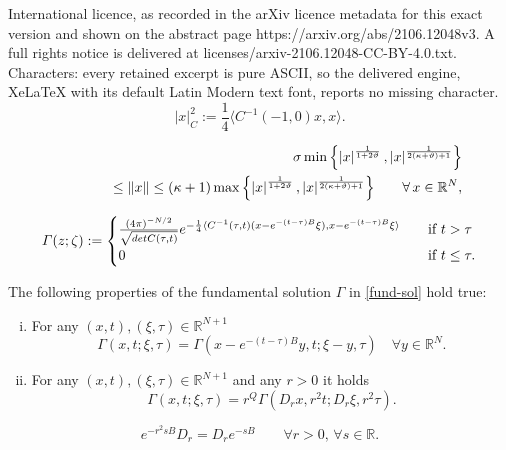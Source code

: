 \documentclass[10pt,a4paper]{amsart}
\def \r{{\mathbb{R}}}
\renewcommand{\Gamma}{\varGamma}
\begin{document}
International licence, as recorded in the arXiv licence metadata for this exact version and shown on the abstract page https://arxiv.org/abs/2106.12048v3. A full rights notice is delivered at licenses/arxiv-2106.12048-CC-BY-4.0.txt. Characters: every retained excerpt is pure ASCII, so the delivered engine, XeLaTeX with its default Latin Modern text font, reports no missing character.
\begin{equation}\label{def:normC}
|x|_{C}^2 := \frac{1}{4}\langle C^{-1}(-1,0) x,x\rangle.
\end{equation}

\begin{eqnarray}\label{confrhomnonhom}
&& \sigma\min{\left\{\left|x\right|^\frac{1}{1+2\vartheta}, \left|x\right|^{\frac{1}{2(\kappa+\vartheta)+1}}\right\}}\notag\\
&& \qquad \quad \leq\left\|x\right\|\leq (\kappa+1)\max{\left\{\left|x\right|^\frac{1}{1+2\vartheta}, \left|x\right|^{\frac{1}{2(\kappa+\vartheta)+1}}\right\}}\qquad \forall\,x\in\r^N,
\end{eqnarray}

\begin{equation} \label{fund-sol}
	\Gamma(z;\zeta):= 
    \begin{cases}
        \frac{(4\pi)^{-N/2}}{\sqrt{\textup{det}C(\tau,t)}}
	e^{-\frac{1}{4}\langle C^{-1}(\tau,t)( x- e^{-(t-\tau)B}\xi ) , x- e^{-(t-\tau)B}\xi \rangle} & \quad \text{if} \ t > \tau\\
    0 & \quad \text{if}\ t \le \tau.
        \end{cases}
\end{equation}

\begin{lemma}\label{lemma:dilation-fundamental}
The following properties of the fundamental solution $\Gamma$ in \eqref{fund-sol} hold true:
\begin{enumerate}[(i)]
 \item   For any $(x,t),(\xi,\tau) \in \mathbb{R}^{N+1}$ 
         \[
         \Gamma(x,t;\xi,\tau) = \Gamma(x-e^{-(t-\tau)B}y,t;\xi-y,\tau) \quad \forall y \in \r^N.
         \]
 \item   For any $(x,t),(\xi,\tau) \in \mathbb{R}^{N+1}$ and any $r>0$ it holds
    \[
   \Gamma(x,t;\xi,\tau) =  r^{Q}\Gamma(D_r x, r^2 t; D_r \xi, r^2 \tau).
    \]
\end{enumerate}
\end{lemma}

\begin{equation}\label{eq:commutator}
e^{-r^2sB}D_r=D_r e^{-sB}\qquad \forall r>0,\, \forall s\in \r.
\end{equation}
\end{document}

